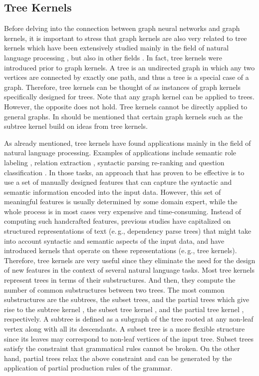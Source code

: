 \documentclass[twoside,11pt]{article}
\newcommand{\eg}{e.\,g., }
\begin{document}
\subsection{Tree Kernels}\label{sec:tree_kernels}
Before delving into the connection between graph neural networks and graph kernels, it is important to stress that graph kernels are also very related to tree kernels which have been extensively studied mainly in the field of natural language processing , but also in other fields .
In fact, tree kernels were introduced prior to graph kernels.
A tree is an undirected graph in which any two vertices are connected by exactly one path, and thus a tree is a special case of a graph.
Therefore, tree kernels can be thought of as instances of graph kernels specifically designed for trees.
Note that any graph kernel can be applied to trees.
However, the opposite does not hold.
Tree kernels cannot be directly applied to general graphs.
In should be mentioned that certain graph kernels such as the subtree kernel build on ideas from tree kernels.

As already mentioned, tree kernels have found applications mainly in the field of natural language processing.
Examples of applications include semantic role labeling , relation extraction , syntactic parsing re-ranking  and question classification .
In those tasks, an approach that has proven to be effective is to use a set of manually designed features that can capture the syntactic and semantic information encoded into the input data.
However, this set of meaningful features is usually determined by some domain expert, while the whole process is in most cases very expensive and time-consuming.
Instead of computing such handcrafted features, previous studies have capitalized on structured representations of text (\eg dependency parse trees) that might take into account syntactic and semantic aspects of the input data, and have introduced kernels that operate on these representations (\eg tree kernels).
Therefore, tree kernels are very useful since they eliminate the need for the design of new features in the context of several natural language tasks.
Most tree kernels represent trees in terms of their substructures.
And then, they compute the number of common substructures between two trees.
The most common substructures are the subtrees, the subset trees, and the partial trees which give rise to the subtree kernel , the subset tree kernel , and the partial tree kernel , respectively.
A subtree is defined as a subgraph of the tree rooted at any non-leaf vertex along with all its descendants.
A subset tree is a more flexible structure since its leaves may correspond to non-leaf vertices of the input tree.
Subset trees satisfy the constraint that grammatical rules cannot be broken.
On the other hand, partial trees relax the above constraint and can be generated by the application of partial production rules of the grammar.
\end{document}
